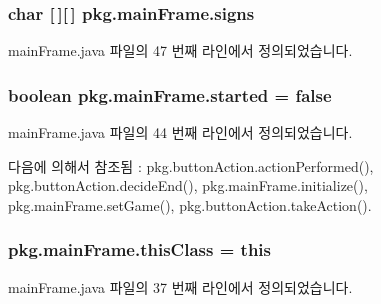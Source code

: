 \subsubsection[{\texorpdfstring{signs}{signs}}]{\setlength{\rightskip}{0pt plus 5cm}char \mbox{[}$\,$\mbox{]}\mbox{[}$\,$\mbox{]} pkg.\+main\+Frame.\+signs\hspace{0.3cm}{\ttfamily [private]}}\hypertarget{classpkg_1_1main_frame_ae3c9f6e7ee48c1661dc3fe814fd67554}{}\label{classpkg_1_1main_frame_ae3c9f6e7ee48c1661dc3fe814fd67554}


main\+Frame.\+java 파일의 47 번째 라인에서 정의되었습니다.

\subsubsection[{\texorpdfstring{started}{started}}]{\setlength{\rightskip}{0pt plus 5cm}boolean pkg.\+main\+Frame.\+started = false\hspace{0.3cm}{\ttfamily [static]}}\hypertarget{classpkg_1_1main_frame_ad050752ff60e9b7fa6ea201df1b223a6}{}\label{classpkg_1_1main_frame_ad050752ff60e9b7fa6ea201df1b223a6}


main\+Frame.\+java 파일의 44 번째 라인에서 정의되었습니다.



다음에 의해서 참조됨 \+:  pkg.\+button\+Action.\+action\+Performed(), pkg.\+button\+Action.\+decide\+End(), pkg.\+main\+Frame.\+initialize(), pkg.\+main\+Frame.\+set\+Game(), pkg.\+button\+Action.\+take\+Action().

\subsubsection[{\texorpdfstring{this\+Class}{thisClass}}]{ pkg.\+main\+Frame.\+this\+Class = this\hspace{0.3cm}{\ttfamily [private]}}\hypertarget{classpkg_1_1main_frame_aa7857342de44fb7ddfa5d6e2685f71fb}{}\label{classpkg_1_1main_frame_aa7857342de44fb7ddfa5d6e2685f71fb}


main\+Frame.\+java 파일의 37 번째 라인에서 정의되었습니다.

